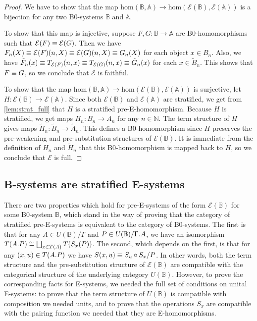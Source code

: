 \begin{proof}
We have to show that the map $\mathrm{hom}(\mathbb{B},\mathbb{A})\to
\mathrm{hom}(\mathcal{E}(\mathbb{B}),\mathcal{E}(\mathbb{A}))$ is a bijection
for any two B0-systems $\mathbb{B}$ and $\mathbb{A}$.

To show that this map is injective, suppose $F,G:\mathbb{B}\to\mathbb{A}$ are 
B0-homomorphisms such that $\mathcal{E}(F)\equiv\mathcal{E}(G)$. Then we have
$F_n(X)\equiv\mathcal{E}(F)(n,X)\equiv \mathcal{E}(G)(n,X)\equiv G_n(X)$ for each
object $x\in B_n$. Also, we have $\tilde{F}_n(x)\equiv T_{\mathcal{E}(F)}(n,x)
\equiv T_{\mathcal{E}(G)}(n,x)\equiv \tilde{G}_n(x)$ for each
$x\in\tilde{B}_n$. This shows that $F\equiv G$, so we conclude that $\mathcal{E}$
is faithful.  

To show that the map $\mathrm{hom}(\mathbb{B},\mathbb{A})\to
\mathrm{hom}(\mathcal{E}(\mathbb{B}),\mathcal{E}(\mathbb{A}))$ 
is surjective, let $H:\mathcal{E}(\mathbb{B})\to
\mathcal{E}(\mathbb{A})$. Since both $\mathcal{E}(\mathbb{B})$ and
$\mathcal{E}(\mathbb{A})$ are stratified, we get from
\autoref{lem:strat_full} that $H$ is a stratified pre-E-homomorphism. 
Because $H$ is stratified, we get maps $H_n:B_n\to A_n$ for any $n\in\mathbb{N}$.
The term structure of $H$ gives maps $\tilde{H}_n:
\tilde{B}_n\to\tilde{A}_n$. This defines a B0-homomorphism since $H$ 
preserves the pre-weakening and pre-substitution structures of $\mathcal{E}(\mathbb{B})$.
It is immediate from the definition of $H_n$ and
$\tilde{H}_n$ that this B0-homomorphism is mapped back to $H$, so we conclude
that $\mathcal{E}$ is full.
\end{proof}

\subsection{B-systems are stratified E-systems}
There are two properties which hold for pre-E-systems of the form $\mathcal{E}
(\mathbb{B})$ for some B0-system $\mathbb{B}$, 
which stand in the way of proving that the category of stratified
pre-E-systems is equivalent to the category of B0-systems. The first is that
for any $A\in U(\mathbb{B})/\Gamma$ and $P\in U(\mathbb{B})/\ctxext{\Gamma}{A}$,
we have an isomorphism $T(\ctxext{A}{P})\cong\bigsqcup_{x\in T(A)}T(S_x(P))$.
The second, which depends on the first, is that for any $(x,u)\in T(\ctxext{A}{P})$
we have $S(x,u)\equiv S_u\circ S_x/P$. In other words, both the term structure
and the pre-substitution structure of $\mathcal{E}(\mathbb{B})$ are compatible
with the categorical structure of the underlying category $U(\mathbb{B})$.
However, to prove the corresponding facts for E-systems, we needed the full
set of conditions on unital E-systems: to prove that the term structure of
$U(\mathbb{B})$ is compatible with composition we needed units, and to prove 
that the operations $S_x$ are compatible with the pairing function we needed
that they are E-homomorphisms. 

